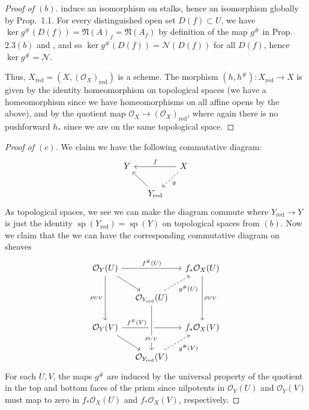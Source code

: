 \documentclass[10pt]{article}
\theoremstyle{definition}
\theoremstyle{remark}
\numberwithin{equation}{section}
\numberwithin{figure}{subsubsection}
\DeclareMathOperator{\Sp}{sp}
\newcommand{\OO}{\mathcal{O}}
\newcommand{\red}{\mathrm{red}}
\begin{document}
\begin{proof}[Proof of $(b)$]
  induce an isomorphism on stalks, hence an isomorphism globally by Prop.~1.1.
  For every distinguished open set $D(f) \subset U$, we have $\ker g^\#(D(f)) = \mathfrak{N}(A)_f = \mathfrak{N}(A_f)$ by definition of the map $g^\#$ in Prop.~$2.3(b)$ and \cite[Cor.~3.12]{AM69}, and so $\ker g^\#(D(f)) = \mathscr{N}(D(f))$ for all $D(f)$, hence $\ker g^\# = \mathscr{N}$.
  \par Thus, $X_\red = (X,(\OO_X)_\red)$ is a scheme. The morphism
  $(h,h^\#)\colon X_\red \to X$ is given by the identity homeomorphism on
  topological spaces (we have a homeomorphism since we have homeomorphisms on
  all affine opens by the above), and by the quotient map $\OO_X \to
  (\OO_X)_\red$, where again there is no pushforward $h_*$ since we are on the same
  topological space.
\end{proof}
\begin{proof}[Proof of $(c)$]
  We claim we have the following commutative diagram:
  \begin{equation*}
    \begin{tikzcd}[column sep=small]
      Y & & \arrow[left]{ll}[swap]{f} X\arrow[dashed]{dl}{g}\\
      & Y_\red\arrow{ul}
    \end{tikzcd}
  \end{equation*}
  As topological spaces, we see we can make the diagram commute where $Y_\red
  \to Y$ is just the identity $\Sp(Y_\red) = \Sp(Y)$ on topological spaces from
  $(b)$. Now we claim that the we can have the corresponding commutative
  diagram on sheaves
  \begin{equation*}
    \begin{tikzcd}[column sep=small]
      \OO_Y(U) \arrow{rr}{f^\#(U)}\arrow{dr}\arrow{dd}[swap]{\rho_{UV}} & &
      f_*\OO_X(U) \arrow{dd}{\rho_{UV}}\\
      & \OO_{Y_\red}(U)\arrow[dashed]{ur}[swap]{g^\#(U)}\\
      \OO_Y(V) \arrow{rr}[near start]{f^\#(V)}\arrow{dr} & & f_*\OO_X(V)\\
      & \OO_{Y_\red}(V)\arrow[dashed]{ur}[swap]{g^\#(V)}
      \arrow[leftarrow,crossing over]{uu}[near start,description]{\rho_{UV}}
    \end{tikzcd}
  \end{equation*}
  For each $U,V$, the maps $g^\#$ are induced by the universal property of the
  quotient in the top and bottom faces of the prism since nilpotents in $\OO_Y(U)$
  and $\OO_Y(V)$ must map to zero in $f_*\OO_X(U)$ and $f_*\OO_X(V)$, respectively.

\end{proof}
\end{document}
